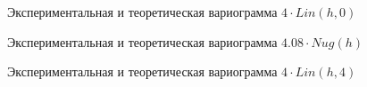 \begin{figure}[H]
\caption{Экспериментальная и теоретическая вариограмма $ 4 \cdot Lin(h, 0) $}
\label{img:lin-modeled}
\end{figure}

\begin{figure}[H]
\caption{Экспериментальная и теоретическая вариограмма $ 4.08 \cdot Nug(h) $}
\label{img:lin-fit}
\end{figure}

\begin{figure}[H]
\caption{Экспериментальная и теоретическая вариограмма $ 4 \cdot Lin(h, 4) $}
\label{img:lin-fit-cv}
\end{figure}

